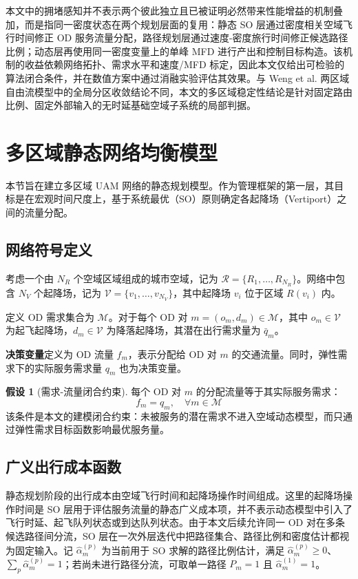 \documentclass[a4paper,12pt]{article}
\theoremstyle{plain}
\theoremstyle{definition}
\newtheorem{assumption}[theorem]{假设}
\theoremstyle{remark}
\begin{document}
本文中的拥堵感知并不表示两个彼此独立且已被证明必然带来性能增益的机制叠加，而是指同一密度状态在两个规划层面的复用：静态 SO 层通过密度相关空域飞行时间修正 OD 服务流量分配，路径规划层通过速度-密度旅行时间修正候选路径比例；动态层再使用同一密度变量上的单峰 MFD 进行产出和控制目标构造。该机制的收益依赖网络拓扑、需求水平和速度/MFD 标定，因此本文仅给出可检验的算法闭合条件，并在数值方案中通过消融实验评估其效果。与 Weng et al. 两区域自由流模型中的全局分区收敛结论不同，本文的多区域稳定性结论是针对固定路由比例、固定外部输入的无时延基础空域子系统的局部判据。

\section{多区域静态网络均衡模型}

本节旨在建立多区域 UAM 网络的静态规划模型。作为管理框架的第一层，其目标是在宏观时间尺度上，基于系统最优（SO）原则确定各起降场（Vertiport）之间的流量分配。

\subsection{网络符号定义}
考虑一个由 $N_R$ 个空域区域组成的城市空域，记为 $\mathcal{R} = \{R_1, \dots, R_{N_R}\}$。网络中包含 $N_V$ 个起降场，记为 $\mathcal{V} = \{v_1, \dots, v_{N_V}\}$，其中起降场 $v_i$ 位于区域 $R(v_i)$ 内。

定义 OD 需求集合为 $\mathcal{M}$。对于每个 OD 对 $m = (o_m, d_m) \in \mathcal{M}$，其中 $o_m \in \mathcal{V}$ 为起飞起降场，$d_m \in \mathcal{V}$ 为降落起降场，其潜在出行需求量为 $\bar{q}_m$。

\textbf{决策变量}定义为 OD 流量 $f_m$，表示分配给 OD 对 $m$ 的交通流量。同时，弹性需求下的实际服务需求量 $q_m$ 也为决策变量。

\begin{assumption}[需求-流量闭合约束]\label{asm:flow_demand}
每个 OD 对 $m$ 的分配流量等于其实际服务需求：
\begin{equation}\label{eq:flow_demand}
    f_m = q_m, \quad \forall m \in \mathcal{M}
\end{equation}
该条件是本文的建模闭合约束：未被服务的潜在需求不进入空域动态模型，而只通过弹性需求目标函数影响最优服务量。
\end{assumption}

\subsection{广义出行成本函数}
静态规划阶段的出行成本由空域飞行时间和起降场操作时间组成。这里的起降场操作时间是 SO 层用于评估服务流量的静态广义成本项，并不表示动态模型中引入了飞行时延、起飞队列状态或到达队列状态。由于本文后续允许同一 OD 对在多条候选路径间分流，SO 层在一次外层迭代中把路径集合、路径比例和密度估计都视为固定输入。记 $\widehat\alpha_m^{(p)}$ 为当前用于 SO 求解的路径比例估计，满足 $\widehat\alpha_m^{(p)}\ge0$、$\sum_p\widehat\alpha_m^{(p)}=1$；若尚未进行路径分流，可取单一路径 $P_m=1$ 且 $\widehat\alpha_m^{(1)}=1$。
\end{document}
